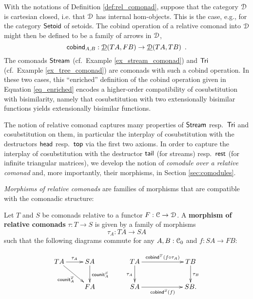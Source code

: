 \documentclass[a4paper,USenglish]{lipics}
\newcommand{\fat}[1]{\textbf{#1}}
\begin{document}
\begin{rem}
 With the notations of Definition \ref{def:rel_comonad}, suppose that the category $\mathcal{D}$ is cartesian closed, i.e. that $\mathcal{D}$ has
 internal hom-objects. This is the case, e.g., for the category $\mathsf{Setoid}$ of setoids.
 The cobind operation of a relative comonad into $\mathcal{D}$ might then be defined to be a family of arrows in $\mathcal{D}$,
  \begin{equation}\mathsf{cobind}_{A,B} : \underline{\mathcal{D}}(TA,FB) \to \underline{\mathcal{D}}(TA,TB) \enspace . \label{eq_enriched}\end{equation}
 The comonads $\mathsf{Stream}$ (cf.\ Example \ref{ex_stream_comonad}) and $\mathsf{Tri}$ (cf.\ Example \ref{ex_tree_comonad}) are comonads with such a cobind operation. In these two cases, this \enquote{enriched} definition of the cobind operation given in Equation \eqref{eq_enriched} encodes a higher-order 
 compatibility of cosubstitution with bisimilarity, namely that cosubstitution with two extensionally bisimilar functions
 yields extensionally bisimilar functions.
\end{rem}


The notion of relative comonad captures many properties of $\mathsf{Stream}$ resp.\ $\mathsf{Tri}$ and cosubstitution on them, in particular the interplay
of cosubstitution with the destructors $\mathsf{head}$ resp.\ $\mathsf{top}$ via the first two axioms.
In order to  capture the interplay 
of cosubstitution  with the destructor $\mathsf{tail}$ (for streams) resp.\ $\mathsf{rest}$ (for infinite triangular matrices), 
we develop the notion of \emph{comodule over a relative comonad} and, more importantly, their morphisms, in Section \ref{sec:comodules}. 








\emph{Morphisms of relative comonads} are families of morphisms that are compatible with the comonadic structure:

\begin{definition}%
\label{def:comonad_morphism}
 Let $T$ and $S$ be comonads relative to a functor $F : {\mathcal{C}} \to \mathcal{D}$. A \fat{morphism of relative comonads} $\tau : T \to S$
  is given by a family of morphisms \[\tau_A : TA \to SA\] such that the following diagrams commute
  for any  $A,B : {\mathcal{C}}_0$ and $f : SA\to FB$:
     
\[ \begin{xy}
    \xymatrix {
                       TA \ar[r]^{\tau_A} \ar[rd]_{\counit^T_A}  &   SA \ar[d]^{\counit^S_A}\\
                            &    FA
   }
   \end{xy}
% 
% 
%   
% 
\qquad
\begin{xy}
     \xymatrix@C=6em{
                     TA \ar[d]_{\tau_A}   \ar[r]^{\cobind^T(\comp{\tau_A}{f})} & TB \ar[d]^{\tau_B}\\
                     SA \ar[r]_{\cobind^S(f)} & SB .
     }  
   \end{xy}
\]

\end{definition}
\end{document}
